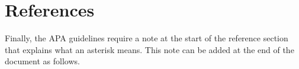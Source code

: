 \documentclass[man]{apa6}
\begin{document}
\newpage

\section{References}\label{references}

\begingroup
\setlength{\parindent}{-0.5in} \setlength{\leftskip}{0.5in}

Finally, the APA guidelines require a note at the start of the reference
section that explains what an asterisk means. This note can be added at
the end of the document as follows.

\hypertarget{refs}{}

\endgroup

\printbibliography
\end{document}
